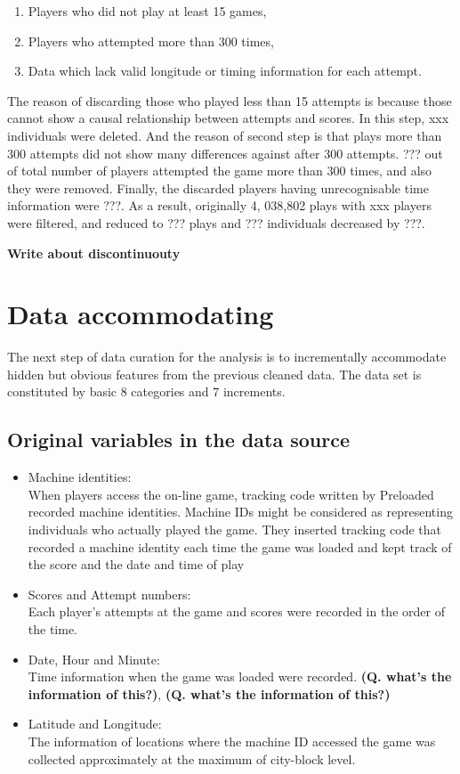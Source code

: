 \documentclass[12pt,a4paper]{report}
\begin{document}
\begin{enumerate}
	\item Players who did not play at least 15 games,
	\item Players who attempted more than 300 times,
	\item Data which lack valid longitude or timing information for each attempt.
\end{enumerate}

The reason of discarding those who played less than 15 attempts is because those cannot show a causal relationship between attempts and scores. In this step, xxx individuals were deleted. 
And the reason of second step is that plays more than 300 attempts did not show many differences against after 300 attempts. ??? out of total number of players attempted the game more than 300 times, and also they were removed. 
Finally, the discarded players having unrecognisable time information were ???. As a result, originally 4, 038,802 plays with xxx players were filtered, and reduced to ??? plays and ??? individuals decreased by ???.

\bigskip
\textbf{Write about discontinuouty}

\section{Data accommodating}
The next step of data curation for the analysis is to incrementally accommodate hidden but obvious features from the previous cleaned data. The data set is constituted by basic 8 categories and 7 increments.

\subsection{Original variables in the data source}
\begin{itemize}
    \item Machine identities:\\
	When players access the on-line game, tracking code written by Preloaded recorded machine identities. Machine IDs might be considered as representing individuals who actually played the game. They inserted tracking code that recorded a machine identity each time the game was loaded and kept track of the score and the date and time of play
	\item Scores and Attempt numbers: \\
	Each player's attempts at the game and scores were recorded in the order of the time.
	\item Date, Hour and Minute: \\
	Time information when the game was loaded were recorded. \textbf{(Q. what's the information of this?)}, \textbf{(Q. what's the information of this?)}
	\item Latitude and Longitude: \\
	The information of locations where the machine ID accessed the game was collected approximately at the maximum of city-block level.
\end{itemize}
	
\end{document}
